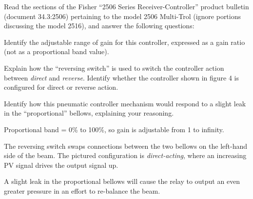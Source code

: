 

Read the sections of the Fisher ``2506 Series Receiver-Controller'' product bulletin (document 34.3:2506) pertaining to the model 2506 Multi-Trol (ignore portions discussing the model 2516), and answer the following questions:

\vskip 10pt

Identify the adjustable range of gain for this controller, expressed as a gain ratio (not as a proportional band value).

\vskip 10pt

Explain how the ``reversing switch'' is used to switch the controller action between {\it direct} and {\it reverse}.  Identify whether the controller shown in figure 4 is configured for direct or reverse action.

\vskip 10pt

Identify how this pneumatic controller mechanism would respond to a slight leak in the ``proportional'' bellows, explaining your reasoning.














Proportional band = 0\% to 100\%, so gain is adjustable from 1 to infinity.

\vskip 10pt

The reversing switch swaps connections between the two bellows on the left-hand side of the beam.  The pictured configuration is {\it direct-acting}, where an increasing PV signal drives the output signal up.

\vskip 10pt

A slight leak in the proportional bellows will cause the relay to output an even greater pressure in an effort to re-balance the beam.




